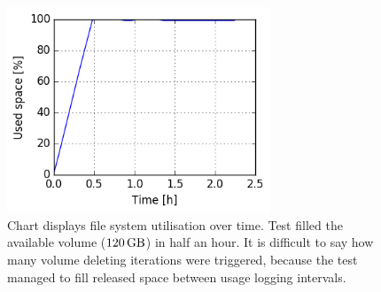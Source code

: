 \documentclass[
  color, %
  table, %
  lof,   %
  lot,   %
]{fithesis3}
\begin{document}
\begin{figure}[h]
    \begin{minipage}{\textwidth}
        \centering
        \includegraphics[width=0.7\textwidth]{../charts/SSD_ext4_trim/usage.png}
        \caption[Usage of available space of ext4 during testing on SSD with regular trimming]{Chart displays file system utilisation over time. Test filled the available volume ($\SI{120}{\giga\byte}$) in half an hour. It is difficult to say how many volume deleting iterations were triggered, because the test managed to fill released space between usage logging intervals.}
\label{fig:usage_ext4_ssd_trim}
    \end{minipage}
\end{figure}
\end{document}
